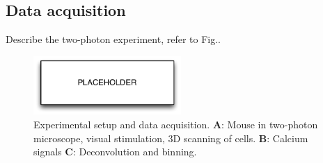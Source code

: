\subsection{Data acquisition}
Describe the two-photon experiment, refer to Fig..

\begin{figure}
\centering
\includegraphics[width=0.5\textwidth]{figures/placeholder.pdf}
\caption{
Experimental setup and data acquisition. 
\textbf{A}: Mouse in two-photon microscope, visual stimulation, 3D scanning of cells.
\textbf{B}: Calcium signals
\textbf{C}: Deconvolution and binning.
}\label{fig:01}
\end{figure}


